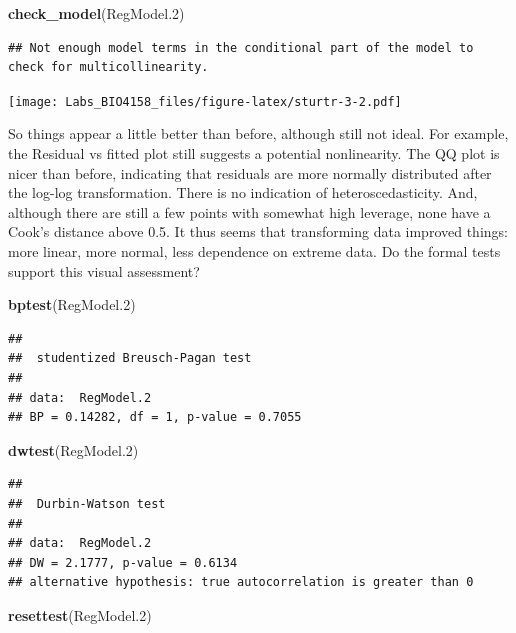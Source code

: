 \documentclass[
  12pt,
]{book}
\newenvironment{Shaded}{\begin{snugshade}}{\end{snugshade}}
\newcommand{\FloatTok}[1]{\textcolor[rgb]{0.00,0.00,0.81}{#1}}
\newcommand{\KeywordTok}[1]{\textcolor[rgb]{0.13,0.29,0.53}{\textbf{#1}}}
\newcommand{\NormalTok}[1]{#1}
\begin{document}
\begin{Shaded}
\begin{Highlighting}[]
\KeywordTok{check\_model}\NormalTok{(RegModel}\FloatTok{.2}\NormalTok{)}
\end{Highlighting}
\end{Shaded}

\begin{verbatim}
## Not enough model terms in the conditional part of the model to check for multicollinearity.
\end{verbatim}

\texttt{[image: Labs\_BIO4158\_files/figure-latex/sturtr-3-2.pdf]}

So things appear a little better than before, although still not ideal. For example, the Residual vs fitted plot still suggests a potential nonlinearity. The QQ plot is nicer than before, indicating that residuals are more normally distributed after the log-log transformation. There is no indication of heteroscedasticity. And, although there are still a few points with somewhat high leverage, none have a Cook's distance above 0.5. It thus seems that transforming data improved things: more linear, more normal, less dependence on extreme data. Do the formal tests support this visual assessment?

\begin{Shaded}
\begin{Highlighting}[]
\KeywordTok{bptest}\NormalTok{(RegModel}\FloatTok{.2}\NormalTok{)}
\end{Highlighting}
\end{Shaded}

\begin{verbatim}
## 
##  studentized Breusch-Pagan test
## 
## data:  RegModel.2
## BP = 0.14282, df = 1, p-value = 0.7055
\end{verbatim}

\begin{Shaded}
\begin{Highlighting}[]
\KeywordTok{dwtest}\NormalTok{(RegModel}\FloatTok{.2}\NormalTok{)}
\end{Highlighting}
\end{Shaded}

\begin{verbatim}
## 
##  Durbin-Watson test
## 
## data:  RegModel.2
## DW = 2.1777, p-value = 0.6134
## alternative hypothesis: true autocorrelation is greater than 0
\end{verbatim}

\begin{Shaded}
\begin{Highlighting}[]
\KeywordTok{resettest}\NormalTok{(RegModel}\FloatTok{.2}\NormalTok{)}
\end{Highlighting}
\end{Shaded}
\end{document}
